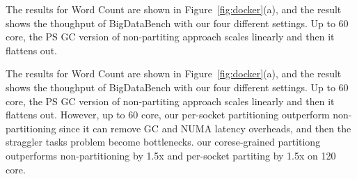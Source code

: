 \fi


\ifkor
The results for Word Count are shown in Figure~\ref{fig:docker}(a), and the
result shows the thoughput of BigDataBench with our four different settings.
Up to 60 core, the PS GC version of non-partiting approach scales linearly and
then it flattens out.
\else 

\fi


\ifkor
The results for Word Count are shown in Figure~\ref{fig:docker}(a), and the
result shows the thoughput of BigDataBench with our four different settings.
Up to 60 core, the PS GC version of non-partiting approach scales linearly and
then it flattens out.
However, up to 60 core, our per-socket partitioning outperform non-partitioning
since it can remove GC and NUMA latency overheads, and then the straggler tasks
problem become bottlenecks.
our corese-grained partitiong outperforms non-partitioning by 1.5x and
per-socket partiting by 1.5x on 120 core.
\else 

\fi

